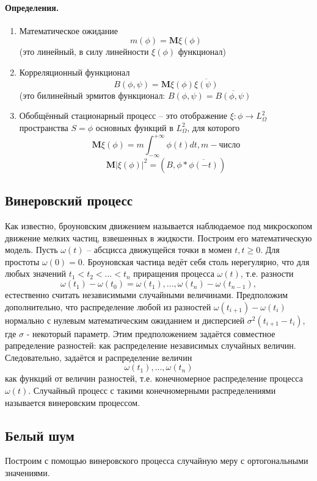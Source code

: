 \paragraph{Определения. } 
\begin{enumerate}
    \item Математическое ожидание
$$m(\phi) = \textbf{M}\xi(\phi)$$
(это линейный, в силу линейности $\xi (\phi)$ функционал)
    \item Корреляционный функционал
$$B(\phi, \psi) = \textbf{M}\xi(\phi)\overline{\xi(\psi)}$$
(это билинейный эрмитов функционал: $B(\phi, \psi) = \overline{B(\phi, \psi)}$
    \item Обобщённый стационарный процесс -- это отображение  $\xi:\phi \longrightarrow L_{\Omega}^2$ пространства $S = {\phi}$ основных функций в $L_{\Omega}^2$, для которого
    $$\textbf{M}\xi(\phi) = m \int_{-\infty} ^ {+\infty}\phi(t)dt, m - \text{число}$$
    $$\textbf{M}|\xi(\phi)|^2 = (B, \phi * \overline{\phi(-t)})$$
\end{enumerate}

\subsection{Винеровский процесс}
Как известно, броуновским движением называется наблюдаемое под микроскопом движение мелких частиц, взвешенных в жидкости. Построим его математическую модель. Пусть $\omega(t)$ -- абсцисса движущейся точки в момен $t, t \geq 0$. Для простоты $\omega(0) = 0$. Броуновская частица ведёт себя столь нерегулярно, что для любых значений $t_1 < t_2 < ... < t_n$ приращения процесса $\omega(t)$, т.е. разности
$$\omega(t_1) - \omega(t_0) = \omega(t_1), ..., \omega(t_n) - \omega(t_{n - 1}),$$ естественно считать независимыми случайными величинами. Предположим дополнительно, что распределение любой из разностей $\omega(t_{i + 1}) - \omega(t_{i})$ нормально с нулевым математическим ожиданием и дисперсией $\sigma^2(t_{i + 1} - t_{i})$, где $\sigma$ - некоторый параметр. Этим предположением задаётся совместное рапределение разностей: как распределение независимых случайных величин. Следовательно, задаётся и распределение величин
$$\omega(t_1), ..., \omega(t_n)$$
как функций от величин разностей, т.е. конечномерное распределение процесса $\omega(t)$. Случайный процесс с такими конечномерными распределениями называется винеровским процессом. 

\subsection{Белый шум}
Построим с помощью винеровского процесса случайную меру с ортогональными значениями.


